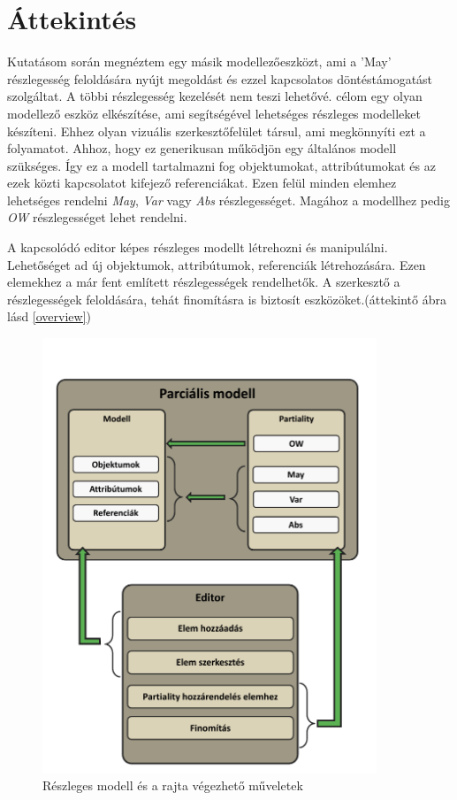 \chapter{Áttekintés}\label{chapter:overview}


Kutatásom során megnéztem egy másik modellezőeszközt, ami a 'May' részlegesség feloldására nyújt megoldást és ezzel kapcsolatos döntéstámogatást szolgáltat\cite{Michalis}. A többi részlegesség kezelését nem teszi lehetővé. célom egy olyan modellező eszköz elkészítése, ami segítségével lehetséges részleges modelleket készíteni. Ehhez olyan vizuális szerkesztőfelület társul, ami megkönnyíti ezt a folyamatot. Ahhoz, hogy ez generikusan működjön egy általános modell szükséges. Így ez a modell tartalmazni fog objektumokat, attribútumokat és az ezek közti kapcsolatot kifejező referenciákat. Ezen felül minden elemhez lehetséges rendelni \textit{May}, \textit{Var} vagy \textit{Abs} részlegességet. Magához a modellhez pedig \textit{OW} részlegességet lehet rendelni.
\par
A kapcsolódó editor képes részleges modellt létrehozni és manipulálni. Lehetőséget ad új objektumok, attribútumok, referenciák létrehozására. Ezen elemekhez a már fent említett részlegességek rendelhetők. A szerkesztő a részlegességek feloldására, tehát finomításra is biztosít eszközöket.(áttekintő ábra lásd \autoref{overview})



\begin{figure}[!ht]
	\centering
	\includegraphics[width=100mm]{figures/overview.pdf}
	\caption{Részleges modell és a rajta végezhető műveletek} 
	\label{overview}
\end{figure}

